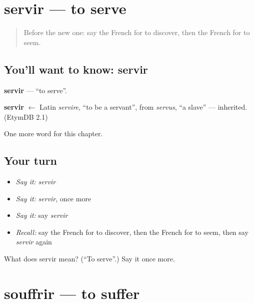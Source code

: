 \section[servir]{servir — to serve}

\label{lesson:FR-C149-servir}



\begin{quote}
Before the new one: say the French for to discover, then the French for to seem.
\end{quote}

\subsection*{You'll want to know: servir}
\textbf{servir} — \textquotedblleft{}to serve\textquotedblright{}.

\begin{cousinweb}
\textbf{servir} $\leftarrow$ Latin \emph{servire}, \textquotedblleft{}to be a servant\textquotedblright{}, from \emph{servus}, \textquotedblleft{}a slave\textquotedblright{} — inherited. (EtymDB 2.1)
\end{cousinweb}

\begin{grammarlens}[title={What you've built}]
One more word for this chapter.
\end{grammarlens}

\subsection*{Your turn}
\begin{itemize}
\raggedright
  \item \emph{Say it:} \emph{servir}
  \item \emph{Say it:} \emph{servir}, once more
  \item \emph{Say it:} say \emph{servir}
  \item \emph{Recall:} say the French for to discover, then the French for to seem, then say \emph{servir} again
\end{itemize}

\begin{tcolorbox}[breakable,colback=teal!4,colframe=teal!35!black,title={Before you move on}]
What does servir mean? (\textquotedblleft{}To serve\textquotedblright{}.) Say it once more.
\end{tcolorbox}
\section[souffrir]{souffrir — to suffer}

